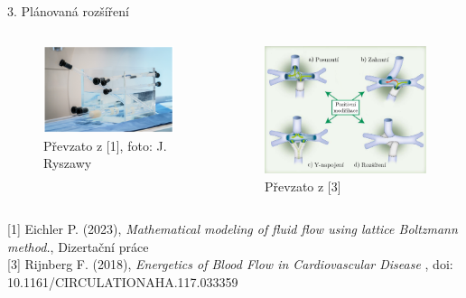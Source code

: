 \documentclass[aspectratio=169,xcolor=dvipsnames]{beamer}
\begin{document}
\begin{frame}[plain]{3. Plánovaná rozšíření}
	\addtocounter{framenumber}{-1}
	\begin{columns}
		\begin{column}{.5\textwidth}
			\begin{figure}
				\renewcommand{\figurename}{Fantom}
				\includegraphics[width=1.0\linewidth, trim={0 0 0cm 0mm}, clip]{Images/fantom.png}
				\caption{Převzato z [1], foto: J. Ryszawy}
			\end{figure}
		\end{column}
		\begin{column}{.5\textwidth}
			\begin{figure}
				\renewcommand{\figurename}{Modifikace systému}
				\includegraphics[width=0.85\linewidth, trim={0 0 0 0mm}, clip]{Images/energyloss.pdf}
				\caption{Převzato z [3]}		
			\end{figure}
		\end{column}
	\end{columns}	
	\vspace{1mm}
	\tiny{[1] Eichler P. (2023)}, \textit{Mathematical modeling of fluid flow using lattice Boltzmann
	method.}, Dizertační práce\\[3pt]
	\tiny{[3] Rijnberg F. (2018), \textit{Energetics of Blood Flow in Cardiovascular
			Disease
		}, doi: 10.1161/CIRCULATIONAHA.117.033359}
\end{frame}
\end{document}
